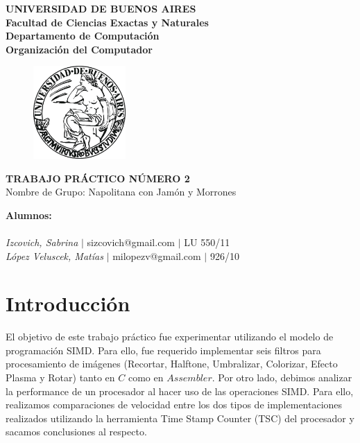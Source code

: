 \documentclass[10pt, a4paper]{article}
\begin{document}
\thispagestyle{empty}
\begin{center}

\Huge{ \bf{UNIVERSIDAD DE BUENOS AIRES}}
\\
\LARGE{\bf{Facultad de Ciencias Exactas y Naturales}}
\\
\textbf{Departamento de Computaci\'on}
\\
\textbf{Organizaci\'on del Computador}
\vspace{2.0\baselineskip}
\end{center}


\begin{figure}[h] %
\begin{center}
\includegraphics[width=100pt]{./image.jpeg}
\end{center}
\end{figure}
\begin{center}
\vspace*{0.7cm}

\huge{\bf TRABAJO PR\'ACTICO N\'UMERO 2}\\
\huge{Nombre de Grupo: Napolitana con Jam\'on y Morrones}
\vspace*{8cm}

\end{center}

\huge{\textbf{Alumnos:}}\\
\\
\vspace*{0.3cm}
\Large{\textsl{Izcovich, Sabrina} $|$ sizcovich@gmail.com $|$ LU 550/11}\\
\vspace*{0.3cm}
\Large{\textsl{L\'opez Veluscek, Matías} \hspace{0.1cm}$|$ milopezv@gmail.com $|$ 926/10}\\
\vspace*{0.3cm}
\vspace{0.5cm}
 
\newpage
\thispagestyle{empty}
\tableofcontents
\newpage
\section{Introducci\'on}
El objetivo de este trabajo pr\'actico fue experimentar utilizando el modelo de programaci\'on SIMD. Para ello, fue requerido implementar seis filtros para procesamiento de im\'agenes (Recortar, Halftone, Umbralizar, Colorizar, Efecto Plasma y Rotar) tanto en $C$ como en $Assembler$.\newline
Por otro lado, debimos analizar la performance de un procesador al hacer uso de las operaciones SIMD. Para ello, realizamos comparaciones de velocidad entre los dos tipos de implementaciones realizados utilizando la herramienta Time Stamp Counter (TSC) del procesador y sacamos conclusiones al respecto.
\end{document}

